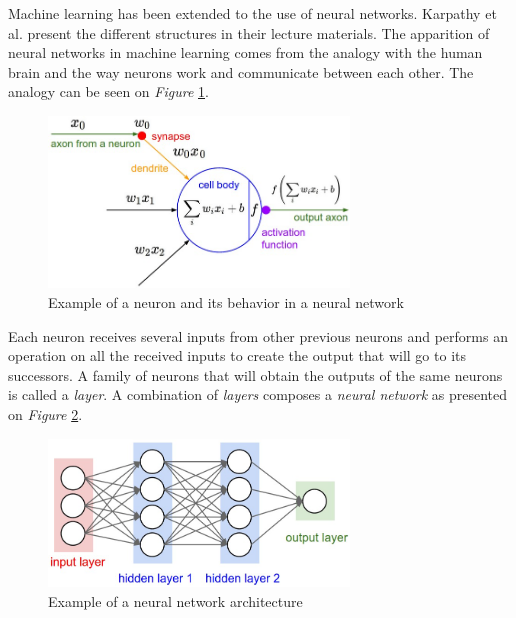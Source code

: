  Machine learning has been extended to the use of neural networks. Karpathy et al. \cite{Karpathy2015} present the different structures in their lecture materials. The apparition of neural networks in machine learning comes from the analogy with the human brain and the way neurons work and communicate between each other. The analogy can be seen on \emph{Figure} \ref{fig:Neuron}.

\begin{figure}[htbp]
	\centering
		\includegraphics[width=8cm]{Figures/Neuron.png}
	\caption[Neuron Example]{Example of a neuron and its behavior in a neural network \cite{Karpathy2015}}
	\label{fig:Neuron}
\end{figure}

Each neuron receives several inputs from other previous neurons and performs an operation on all the received inputs to create the output that will go to its successors. A family of neurons that will obtain the outputs of the same neurons is called a \emph{layer}. A combination of \emph{layers} composes a \emph{neural network} as presented on \emph{Figure} \ref{fig:NN}.

\begin{figure}[htbp]
	\centering
		\includegraphics[width=8cm]{Figures/NN.png}
	\caption[Neural Network Example]{Example of a neural network architecture \cite{Karpathy2015}}
	\label{fig:NN}
\end{figure}

